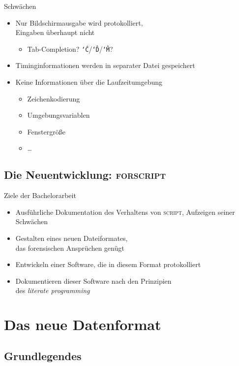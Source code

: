 \documentclass[ignorenonframetext,ucs]{beamer}
\def\cmd{\textsc}
\begin{document}
\begin{frame}{Schwächen}
\begin{itemize}
\item Nur Bildschirmausgabe wird protokolliert, \\ Eingaben überhaupt nicht\begin{itemize}
\item Tab-Completion? \texttt{\char`\^C}/\texttt{\char`\^D}/\texttt{\char`\^M}?\end{itemize}
\item Timinginformationen werden in separater Datei gespeichert
\item Keine Informationen über die Laufzeitumgebung\begin{itemize}
\item Zeichenkodierung
\item Umgebungsvariablen
\item Fenstergröße
\item …\end{itemize}
\end{itemize}
\end{frame}

\subsection{Die Neuentwicklung: \cmd{forscript}}

\begin{frame}{Ziele der Bachelorarbeit}
\begin{itemize}
\item Ausführliche Dokumentation des Verhaltens von \cmd{script}, Aufzeigen seiner Schwächen
\item Gestalten eines neuen Dateiformates, \\ das forensischen Ansprüchen genügt
\item Entwickeln einer Software, die in diesem Format protokolliert
\item Dokumentieren dieser Software nach den Prinzipien \\ des \emph{literate programming}
\end{itemize}
\end{frame}

\section{Das neue Datenformat}

\subsection{Grundlegendes}
\end{document}
